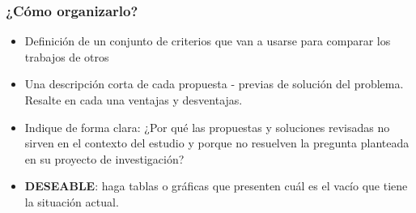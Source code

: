 \subsubsection*{¿Cómo organizarlo?}
\begin{itemize}
    \item Definición de un conjunto de criterios que van a usarse para comparar los trabajos de otros
    \item Una descripción corta de cada propuesta - previas de solución del problema. Resalte en cada una ventajas y desventajas. 
    \item  Indique de forma clara: ¿Por qué las propuestas y soluciones revisadas no sirven en el contexto del estudio y porque no resuelven la pregunta planteada en su proyecto de investigación?
    \item \textbf{DESEABLE}: haga tablas o gráficas que presenten cuál es el vacío que tiene la situación actual. 
\end{itemize}


